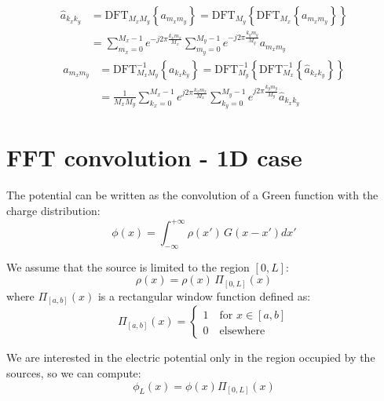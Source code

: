 \begin{equation}
\begin{split}
\hat{a}_{k_xk_y} &= \text{DFT}_{M_xM_y}\left\{a_{m_xm_y}\right\}  
= \text{DFT}_{M_y} \left\{\text{DFT}_{M_x}\left\{a_{m_xm_y}\right\}\right\}\\  
&=\sum_{m_x=0}^{M_x-1} e^{-j 2\pi  \frac{k_x m_x}{M_x}} 
\sum_{m_y=0}^{M_y-1} e^{-j 2\pi  \frac{k_y m_y}{M_y}} a_{m_xm_y}
\end{split}
\end{equation}
\begin{equation}
\begin{split}
{a}_{m_xm_y} &= \text{DFT}^{-1}_{M_xM_y}\left\{a_{k_x k_y}\right\}  
= \text{DFT}^{-1}_{M_y} \left\{\text{DFT}^{-1}_{M_x}\left\{\hat{a}_{k_x k_y}\right\}\right\}\\  
&=\frac{1}{M_x M_y}\sum_{k_x=0}^{M_x-1} e^{j 2\pi  \frac{k_x m_x}{M_x}} 
\sum_{k_y=0}^{M_y-1} e^{j 2\pi  \frac{k_y m_y}{M_y}} \hat{a}_{k_xk_y}
\end{split}
\end{equation}

\section{FFT convolution - 1D case}
\label{sec:fftconv1d}
The potential can be written as the convolution of a Green function with the charge distribution:
\begin{equation}
\phi(x) = \int_{-\infty}^{+\infty} \rho(x')\,G(x-x') dx'
\label{eq:conv}
\end{equation}

We assume that the source is limited to the region  $[0, L]$:
\begin{equation}
\rho(x) = \rho(x)\,\Pi_{[0,L]}\left(x\right)
\label{eq:rholim}
\end{equation}
where $\Pi_{[a,b]}(x)$ is a rectangular window function defined as:
\begin{equation}
\Pi_{[a,b]}(x) = 
\begin{cases}
1\quad\text{for } x \in [a, b]\\
0\quad\text{elsewhere}
\end{cases}
\end{equation}

We are interested in the electric potential only in the region occupied by the sources, so we can compute:
\begin{equation}
\phi_L(x) = \phi(x) \Pi_{[0, L]}\left(x\right)
\label{eq:philim}
\end{equation}

